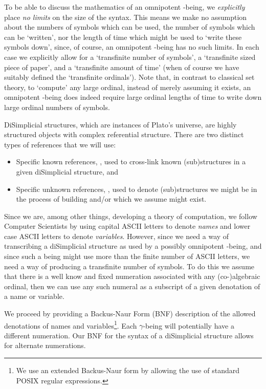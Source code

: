 \documentclass[a4paper,openany]{amsbook}
\begin{document}
To be able to discuss the mathematics of an omnipotent \Cardinal-being, we
\emph{explicitly} place \emph{no limits} on the size of the syntax. This means we
make no assumption about the numbers of symbols which can be used, the number of
symbols which can be `written', nor the length of time which might be used to
`write these symbols down', since, of course, an omnipotent \Cardinal-being has
no such limits. In each case we explicitly allow for a `transfinite number of
symbols', a `transfinite sized piece of paper', and a `transfinite amount of
time' (when of course we have suitably defined the `transfinite ordinals'). Note
that, in contrast to classical set theory, to `compute' any large ordinal,
instead of merely assuming it exists, an omnipotent \Cardinal-being does indeed
require large ordinal lengths of time to write down large ordinal numbers of
symbols.

DiSimplicial structures, which are instances of Plato's universe, are highly
structured objects with complex referential structure. There are two
distinct types of references that we will use: 
%
\begin{itemize}
%
\item Specific known references, , used to cross-link known
(sub)structures in a given diSimplicial structure, and 
%
\item Specific unknown references, , used to denote
(sub)structures we might be in the process of building and/or which we assume
might exist. 
%
\end{itemize}
%

Since we are, among other things, developing a theory of computation, we follow
Computer Scientists by using capital ASCII letters to denote \emph{names} and
lower case ASCII letters to denote \emph{variables}. However, since we need a
way of transcribing a diSimplicial structure as used by a possibly omnipotent
\Cardinal-being, and since such a being might use more than the finite number of
ASCII letters, we need a way of producing a transfinite number of symbols. To do
this we assume that there is a well know and fixed numeration associated with
any (co-)algebraic ordinal, then we can use any such numeral as a subscript of a
given denotation of a name or variable.

We proceed by providing a Backus-Naur Form (BNF) description of the allowed
denotations of names and variables\footnote{We use an extended Backus-Naur form
by allowing the use of standard POSIX regular expressions.}. Each $\gamma$-being
will potentially have a different numeration. Our BNF for the syntax of a
diSimplicial structure allows for alternate numerations.
\end{document}
